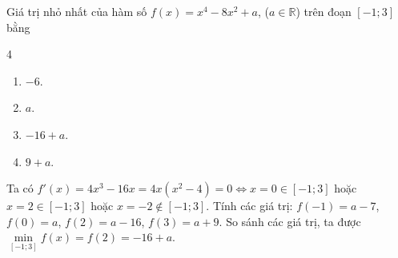 \begin{baitap}
	Giá trị nhỏ nhất của hàm số $f(x)=x^4-8x^2+a$, ($a\in\mathbb{R}$) trên đoạn $[-1; 3]$ bằng
	\begin{multicols}{4}
		\begin{enumerate}
			\item $-6$.
			\item $a$.
			\item $-16+a$.
			\item $9+a$.
		\end{enumerate}
	\end{multicols}
	\begin{traloi}
		Ta có $f'(x)=4x^3-16x=4x(x^2-4)=0 \Leftrightarrow x=0 \in [-1; 3]$ hoặc $x=2 \in [-1; 3]$ hoặc $x=-2 \notin [-1; 3]$.
		Tính các giá trị: $f(-1)=a-7$, $f(0)=a$, $f(2)=a-16$, $f(3)=a+9$.
		So sánh các giá trị, ta được $\min\limits_{[-1; 3]} f(x) = f(2) = -16+a$.
	\end{traloi}
\end{baitap}

